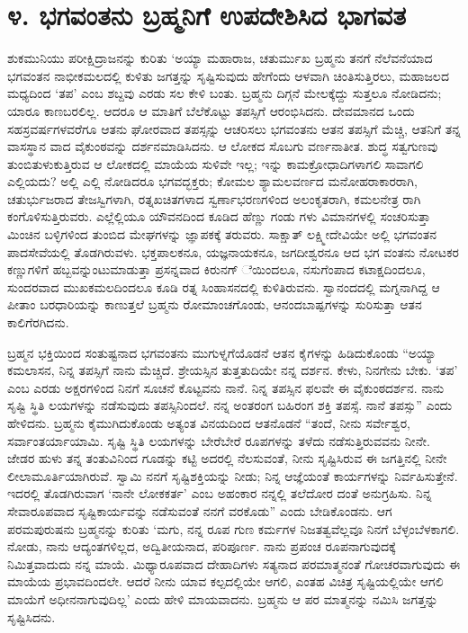 
\chapter{೪. ಭಗವಂತನು ಬ್ರಹ್ಮನಿಗೆ ಉಪದೇಶಿಸಿದ ಭಾಗವತ}

ಶುಕಮುನಿಯು ಪರೀಕ್ಷಿದ್ರಾಜನನ್ನು ಕುರಿತು ‘ಅಯ್ಯಾ ಮಹಾರಾಜ, ಚತುರ್ಮುಖ ಬ್ರಹ್ಮನು ತನಗೆ ನೆಲೆವನೆಯಾದ ಭಗವಂತನ ನಾಭೀಕಮಲದಲ್ಲಿ ಕುಳಿತು ಜಗತ್ತನ್ನು ಸೃಷ್ಟಿಸುವುದು ಹೇಗೆಂದು ಆಳವಾಗಿ ಚಿಂತಿಸುತ್ತಿರಲು, ಮಹಾಜಲದ ಮಧ್ಯದಿಂದ ‘ತಪ’ ಎಂಬ ಶಬ್ದವು ಎರಡು ಸಲ ಕೇಳಿ ಬಂತು. ಬ್ರಹ್ಮನು ದಿಗ್ಗನೆ ಮೇಲಕ್ಕೆದ್ದು ಸುತ್ತಲೂ ನೋಡಿದನು; ಯಾರೂ ಕಾಣಬರಲಿಲ್ಲ. ಆದರೂ ಆ ಮಾತಿಗೆ ಬೆಲೆಕೊಟ್ಟು ತಪಸ್ಸಿಗೆ ಆರಂಭಿಸಿದನು. ದೇವಮಾನದ ಒಂದು ಸಹಸ್ರವರ್ಷಗಳವರೆಗೂ ಆತನು ಘೋರವಾದ ತಪಸ್ಸನ್ನು ಆಚರಿಸಲು ಭಗವಂತನು ಆತನ ತಪಸ್ಸಿಗೆ ಮೆಚ್ಚಿ, ಆತನಿಗೆ ತನ್ನ ವಾಸಸ್ಥಾನ ವಾದ ವೈಕುಂಠವನ್ನು ದರ್ಶನಮಾಡಿಸಿದನು. ಆ ಲೋಕದ ಸೊಬಗು ವರ್ಣನಾತೀತ. ಶುದ್ಧ ಸತ್ವಗುಣವು ತುಂಬಿತುಳುಕುತ್ತಿರುವ ಆ ಲೋಕದಲ್ಲಿ ಮಾಯೆಯ ಸುಳಿವೇ ಇಲ್ಲ; ಇನ್ನು ಕಾಮಕ್ರೋಧಾದಿಗಳಾಗಲಿ ಸಾವಾಗಲಿ ಎಲ್ಲಿಯದು? ಅಲ್ಲಿ ಎಲ್ಲಿ ನೋಡಿದರೂ ಭಗವದ್ಭಕ್ತರು; ಕೋಮಲ ಶ್ಯಾಮಲವರ್ಣದ ಮನೋಹರಾಕಾರರಾಗಿ, ಚತುರ್ಭುಜರಾದ ತೇಜಸ್ವಿಗಳಾಗಿ, ರತ್ನಖಚಿತಗಳಾದ ಸ್ವರ್ಣಾಭರಣಗಳಿಂದ ಅಲಂಕೃತರಾಗಿ, ಕಮಲನೇತ್ರ ರಾಗಿ ಕಂಗೊಳಿಸುತ್ತಿರುವರು. ಎಲ್ಲೆಲ್ಲಿಯೂ ಯೌವನದಿಂದ ಕೂಡಿದ ಹೆಣ್ಣು ಗಂಡು ಗಳು ವಿಮಾನಗಳಲ್ಲಿ ಸಂಚರಿಸುತ್ತಾ ಮಿಂಚಿನ ಬಳ್ಳಿಗಳಿಂದ ತುಂಬಿದ ಮೇಘಗಳನ್ನು ಜ್ಞಾಪಕಕ್ಕೆ ತರುವರು. ಸಾಕ್ಷಾತ್ ಲಕ್ಷ್ಮೀದೇವಿಯೇ ಅಲ್ಲಿ ಭಗವಂತನ ಪಾದಸೇವೆಯಲ್ಲಿ ತೊಡಗಿರುವಳು. ಭಕ್ತಪಾಲಕನೂ, ಯಜ್ಞನಾಯಕನೂ, ಜಗದೀಶ್ವರನೂ ಆದ ಭಗ ವಂತನು ನೋಟಕರ ಕಣ್ಣುಗಳಿಗೆ ಹಬ್ಬವನ್ನುಂಟುಮಾಡುತ್ತಾ ಪ್ರಸನ್ನವಾದ ಕಿರುನಗ್ ೆಯಿಂದಲೂ, ನಸುಗೆಂಪಾದ ಕಟಾಕ್ಷದಿಂದಲೂ, ಸುಂದರವಾದ ಮುಖಕಮಲದಿಂದಲೂ ಕೂಡಿ ರತ್ನ ಸಿಂಹಾಸನದಲ್ಲಿ ಕುಳಿತಿರುವನು. ಸ್ವಾನಂದದಲ್ಲಿ ಮಗ್ನನಾಗಿದ್ದ ಆ ಪೀತಾಂ ಬರಧಾರಿಯನ್ನು ಕಾಣುತ್ತಲೆ ಬ್ರಹ್ಮನು ರೋಮಾಂಚಗೊಂಡು, ಆನಂದಬಾಷ್ಪಗಳನ್ನು ಸುರಿಸುತ್ತಾ ಆತನ ಕಾಲಿಗೆರಗಿದನು.

ಬ್ರಹ್ಮನ ಭಕ್ತಿಯಿಂದ ಸಂತುಷ್ಟನಾದ ಭಗವಂತನು ಮುಗುಳ್ನಗೆಯೊಡನೆ ಆತನ ಕೈಗಳನ್ನು ಹಿಡಿದುಕೊಂಡು “ಅಯ್ಯಾ ಕಮಲಾಸನ, ನಿನ್ನ ತಪಸ್ಸಿಗೆ ನಾನು ಮೆಚ್ಚಿದೆ. ಶ್ರೇಯಸ್ಸಿನ ತುತ್ತತುದಿಯೇ ನನ್ನ ದರ್ಶನ. ಕೇಳು, ನಿನಗೇನು ಬೇಕು. ‘ತಪ’ ಎಂಬ ಎರಡು ಅಕ್ಷರಗಳಿಂದ ನಿನಗೆ ಸೂಚನೆ ಕೊಟ್ಟವನು ನಾನೆ. ನಿನ್ನ ತಪಸ್ಸಿನ ಫಲವೇ ಈ ವೈಕುಂಠದರ್ಶನ. ನಾನು ಸೃಷ್ಟಿ ಸ್ಥಿತಿ ಲಯಗಳನ್ನು ನಡೆಸುವುದು ತಪಸ್ಸಿನಿಂದಲೆ. ನನ್ನ ಅಂತರಂಗ ಬಹಿರಂಗ ಶಕ್ತಿ ತಪಸ್ಸೆ. ನಾನೆ ತಪಸ್ಸು” ಎಂದು ಹೇಳಿದನು. ಬ್ರಹ್ಮನು ಕೈಮುಗಿದುಕೊಂಡು ಅತ್ಯಂತ ವಿನಯದಿಂದ ಆತನೊಡನೆ “ತಂದೆ, ನೀನು ಸರ್ವೇಶ್ವರ, ಸರ್ವಾಂತರ್ಯಾಯಾಮಿ. ಸೃಷ್ಟಿ ಸ್ಥಿತಿ ಲಯಗಳನ್ನು ಬೇರೆಬೇರೆ ರೂಪಗಳನ್ನು ತಳೆದು ನಡೆಸುತ್ತಿರುವವನು ನೀನೇ. ಜೇಡರ ಹುಳು ತನ್ನ ತಂತುವಿನಿಂದ ಗೂಡನ್ನು ಕಟ್ಟಿ ಅದರಲ್ಲಿ ನೆಲಸುವಂತೆ, ನೀನು ಸೃಷ್ಟಿಸಿರುವ ಈ ಜಗತ್ತಿನಲ್ಲಿ ನೀನೇ ಲೀಲಾಮೂರ್ತಿಯಾಗಿರುವೆ. ಸ್ವಾಮಿ ನನಗೆ ಸೃಷ್ಟಿಶಕ್ತಿಯನ್ನು ನೀಡು; ನಿನ್ನ ಆಜ್ಞೆಯಂತೆ ಕಾರ್ಯಗಳನ್ನು ನಿರ್ವಹಿಸುತ್ತೇನೆ. ಇದರಲ್ಲಿ ತೊಡಗಿರುವಾಗ ‘ನಾನೇ ಲೋಕಕರ್ತ’ ಎಂಬ ಅಹಂಕಾರ ನನ್ನಲ್ಲಿ ತಲೆದೋರ ದಂತೆ ಅನುಗ್ರಹಿಸು. ನಿನ್ನ ಸೇವಾರೂಪವಾದ ಸೃಷ್ಟಿಕಾರ್ಯವನ್ನು ನಡೆಸುವಂತೆ ನನಗೆ ವರಕೊಡು” ಎಂದು ಬೇಡಿಕೊಂಡನು. ಆಗ ಪರಮಪುರುಷನು ಬ್ರಹ್ಮನನ್ನು ಕುರಿತು ‘ಮಗು, ನನ್ನ ರೂಪ ಗುಣ ಕರ್ಮಗಳ ನಿಜತತ್ವವೆಲ್ಲವೂ ನಿನಗೆ ಬೆಳ್ಳಂಬೆಳಕಾಗಲಿ. ನೋಡು, ನಾನು ಆದ್ಯಂತಗಳಿಲ್ಲದ, ಅದ್ವಿತೀಯನಾದ, ಪರಿಪೂರ್ಣ. ನಾನು ಪ್ರಪಂಚ ರೂಪನಾಗುವುದಕ್ಕೆ ನಿಮಿತ್ತವಾದುದು ನನ್ನ ಮಾಯೆ. ಮಿಥ್ಯಾರೂಪವಾದ ದೇಹಾದಿಗಳು ಸತ್ಯನಾದ ಪರಮಾತ್ಮನಂತೆ ಗೋಚರವಾಗುವುದು ಈ ಮಾಯೆಯ ಪ್ರಭಾವದಿಂದಲೇ. ಆದರೆ ನೀನು ಯಾವ ಕಲ್ಪದಲ್ಲಿಯೇ ಆಗಲಿ, ಎಂತಹ ವಿಚಿತ್ರ ಸೃಷ್ಟಿಯಲ್ಲಿಯೇ ಆಗಲಿ ಮಾಯೆಗೆ ಅಧೀನನಾಗುವುದಿಲ್ಲ’ ಎಂದು ಹೇಳಿ ಮಾಯವಾದನು. ಬ್ರಹ್ಮನು ಆ ಪರ ಮಾತ್ಮನನ್ನು ನಮಿಸಿ ಜಗತ್ತನ್ನು ಸೃಷ್ಟಿಸಿದನು.

